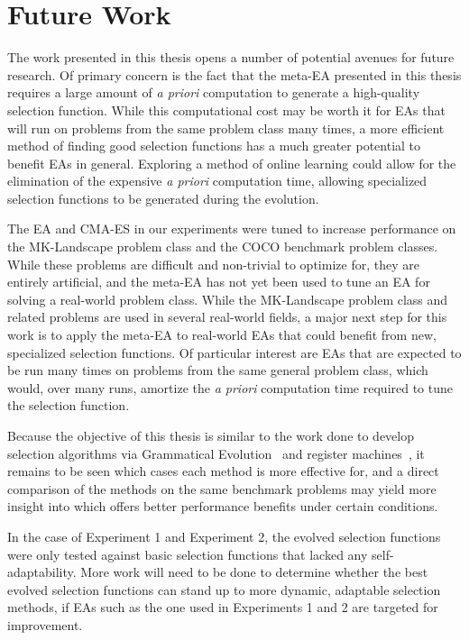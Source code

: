 \documentclass[sigconf]{acmart}
\begin{document}
\section{Future Work}
\label{Future Work}
The work presented in this thesis opens a number of potential avenues for future research. Of primary concern is the fact that the meta-EA presented in this thesis requires a large amount of \textit{a priori} computation to generate a high-quality selection function. While this computational cost may be worth it for EAs that will run on problems from the same problem class many times, a more efficient method of finding good selection functions has a much greater potential to benefit EAs in general. Exploring a method of online learning could allow for the elimination of the expensive \textit{a priori} computation time, allowing specialized selection functions to be generated during the evolution.

The EA and CMA-ES in our experiments were tuned to increase performance on the MK-Landscape problem class and the COCO benchmark problem classes. While these problems are difficult and non-trivial to optimize for, they are entirely artificial, and the meta-EA has not yet been used to tune an EA for solving a real-world problem class. While the MK-Landscape problem class and related problems are used in several real-world fields, a major next step for this work is to apply the meta-EA to real-world EAs that could benefit from new, specialized selection functions. Of particular interest are EAs that are expected to be run many times on problems from the same general problem class, which would, over many runs, amortize the \textit{a priori} computation time required to tune the selection function.

Because the objective of this thesis is similar to the work done to develop selection algorithms via Grammatical Evolution~\citep{lourencco2013selection} and register machines~\citep{woodward2011selection}, it remains to be seen which cases each method is more effective for, and a direct comparison of the methods on the same benchmark problems may yield more insight into which offers better performance benefits under certain conditions.

In the case of Experiment 1 and Experiment 2, the evolved selection functions were only tested against basic selection functions that lacked any self-adaptability. More work will need to be done to determine whether the best evolved selection functions can stand up to more dynamic, adaptable selection methods, if EAs such as the one used in Experiments 1 and 2 are targeted for improvement.
\end{document}
